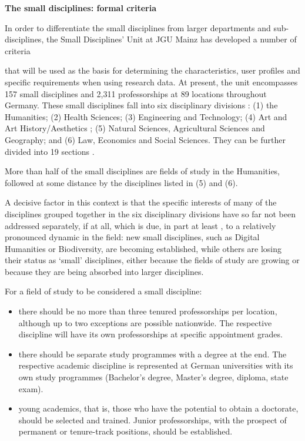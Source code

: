 \documentclass[
  english,
  paper=a4,
  oneside,captions=tableheading
]{scrbook}
\begin{document}
\textbf{The small disciplines: formal criteria}

In order to differentiate the small disciplines from larger departments
and sub-disciplines, the Small Disciplines' Unit at JGU Mainz has
developed a number of criteria

that will be used as the basis for determining the characteristics, user
profiles and specific requirements when using research data. At present,
the unit encompasses 157 small disciplines and 2,311 professorships at
89 locations throughout Germany. These small disciplines fall into six
disciplinary divisions : (1) the Humanities; (2) Health Sciences; (3)
Engineering and Technology; (4) Art and Art History/Aesthetics ; (5)
Natural Sciences, Agricultural Sciences and Geography; and (6) Law,
Economics and Social Sciences. They can be further divided into 19
sections .

More than half of the small disciplines are fields of study in the
Humanities, followed at some distance by the disciplines listed in (5)
and (6).

A decisive factor in this context is that the specific interests of many
of the disciplines grouped together in the six disciplinary divisions
have so far not been addressed separately, if at all, which is due, in
part at least , to a relatively pronounced dynamic in the field: new
small disciplines, such as Digital Humanities or Biodiversity, are
becoming established, while others are losing their status as `small'
disciplines, either because the fields of study are growing or because
they are being absorbed into larger disciplines.

For a field of study to be considered a small discipline:

\begin{itemize}
\item
  there should be no more than three tenured professorships per
  location, although up to two exceptions are possible nationwide. The
  respective discipline will have its own professorships at specific
  appointment grades.
\item
  there should be separate study programmes with a degree at the end.
  The respective academic discipline is represented at German
  universities with its own study programmes (Bachelor's degree,
  Master's degree, diploma, state exam).
\item
  young academics, that is, those who have the potential to obtain a
  doctorate, should be selected and trained. Junior professorships, with
  the prospect of permanent or tenure-track positions, should be
  established.
\end{itemize}
\end{document}
